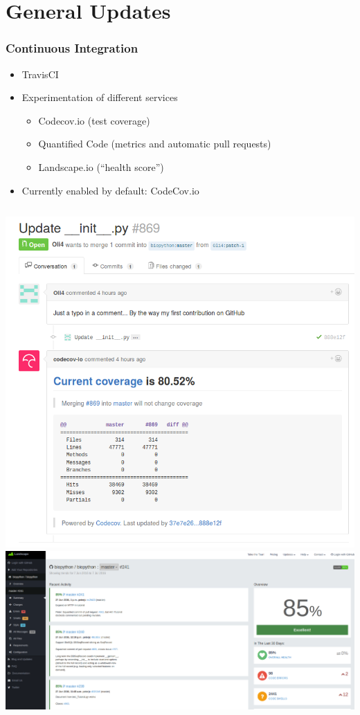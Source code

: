 \documentclass[trans]{beamer}
\begin{document}
\section{General Updates}
\frame
{
  \frametitle{Continuous Integration}

  \begin{itemize}
  \item TravisCI
  \item Experimentation of different services
  \begin{itemize}
  \item Codecov.io (test coverage)
  \item Quantified Code (metrics and automatic pull requests)
  \item Landscape.io (``health score'')
  \end{itemize}
  \item Currently enabled by default: CodeCov.io
  \end{itemize}

  \begin{columns}
  \includegraphics[width=1\textwidth]{bp-codecov.png}
  \includegraphics[width=1\textwidth]{bp-landscape.png}
  \end{columns}
}
\end{document}
